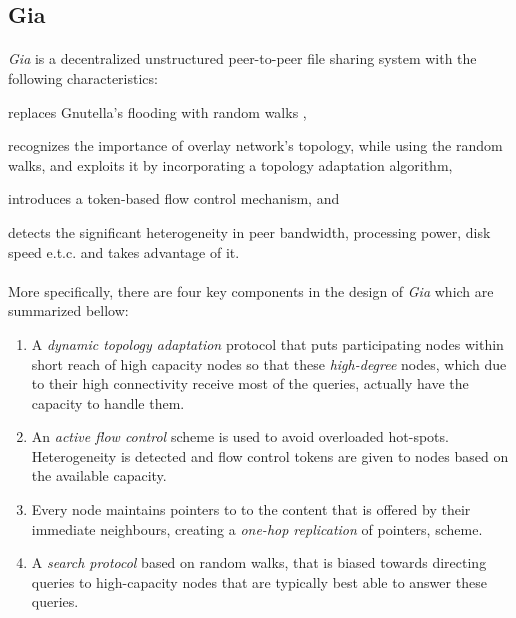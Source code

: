 \documentclass[a4paper,10pt]{article}
\begin{document}
\subsection{Gia}

\paragraph*{}
\emph{Gia} \cite{chawathe_gia_2003} is a decentralized unstructured peer-to-peer file sharing system with the following characteristics:
\begin{inparaenum}
  \item replaces Gnutella's flooding with random walks \cite{lv_randomwalks_2002},
  \item recognizes the importance of overlay network's topology, while using the random walks, and exploits it by incorporating a topology adaptation algorithm,
  \item introduces a token-based flow control mechanism, and
  \item detects the significant heterogeneity in peer bandwidth, processing power, disk speed e.t.c. and takes advantage of it.
\end{inparaenum}

\paragraph*{}
More specifically, there are four key components in the design of \emph{Gia} which are summarized bellow:
\begin{enumerate}
  \item A \emph{dynamic topology adaptation} protocol that puts participating nodes within short reach of high capacity nodes so that these \emph{high-degree} nodes, which due to their high connectivity receive most of the queries, actually have the capacity to handle them.
  \item An \emph{active flow control} scheme is used to avoid overloaded hot-spots. Heterogeneity is detected and flow control tokens are given to nodes based on the available capacity.
  \item Every node maintains pointers to to the content that is offered by their immediate neighbours, creating a \emph{one-hop replication} of pointers, scheme.
  \item A \emph{search protocol} based on random walks, that is biased towards directing queries to high-capacity nodes that are typically best able to answer these queries.
\end{enumerate}
\end{document}
